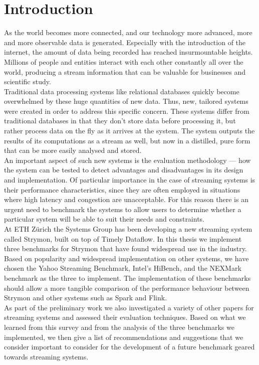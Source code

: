 \section{Introduction}
As the world becomes more connected, and our technology more advanced, more and more observable data is generated. Especially with the introduction of the internet, the amount of data being recorded has reached insurmountable heights. Millions of people and entities interact with each other constantly all over the world, producing a stream information that can be valuable for businesses and scientific study. \\

Traditional data processing systems like relational databases quickly become overwhelmed by these huge quantities of new data. Thus, new, tailored systems were created in order to address this specific concern. These systems differ from traditional databases in that they don't store data before processing it, but rather process data on the fly as it arrives at the system. The system outputs the results of its computations as a stream as well, but now in a distilled, pure form that can be more easily analysed and stored. \\

An important aspect of such new systems is the evaluation methodology --- how the system can be tested to detect advantages and disadvantages in its design and implementation. Of particular importance in the case of streaming systems is their performance characteristics, since they are often employed in situations where high latency and congestion are unacceptable. For this reason there is an urgent need to benchmark the systems to allow users to determine whether a particular system will be able to suit their needs and constraints. \\

At ETH Zürich the Systems Group has been developing a new streaming system called Strymon\cite{strymon}, built on top of Timely Dataflow\cite{timely}. In this thesis we implement three benchmarks for Strymon that have found widespread use in the industry. Based on popularity and widespread implementation on other systems, we have chosen the Yahoo Streaming Benchmark\cite{ysb}, Intel's HiBench\cite{hibench}, and the NEXMark benchmark\cite{nexmark} as the three to implement. The implementation of these benchmarks should allow a more tangible comparison of the performance behaviour between Strymon and other systems such as Spark and Flink. \\

As part of the preliminary work we also investigated a variety of other papers for streaming systems and assessed their evaluation techniques. Based on what we learned from this survey and from the analysis of the three benchmarks we implemented, we then give a list of recommendations and suggestions that we consider important to consider for the development of a future benchmark geared towards streaming systems.


